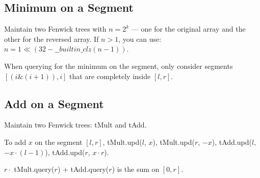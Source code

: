 \subsection*{Minimum on a Segment}

Maintain two Fenwick trees with $n = 2^k$ — one for the original array and the other for the reversed array. If $n > 1$, you can use:
$n = 1 \ll (32 - \_\_builtin\_clz(n - 1))$.

When querying for the minimum on the segment, only consider segments $[(i \& (i + 1)), i]$ that are completely inside $[l, r]$.

\subsection*{Add on a Segment}

Maintain two Fenwick trees: tMult and tAdd.

To add $x$ on the segment $[l, r]$, tMult.upd($l$, $x$), tMult.upd($r$, $-x$),
tAdd.upd($l$, $-x \cdot (l - 1)$), tAdd.upd($r$, $x \cdot r$).

$r \cdot$ tMult.query($r$) + tAdd.query($r$) is the sum on $[0, r]$.